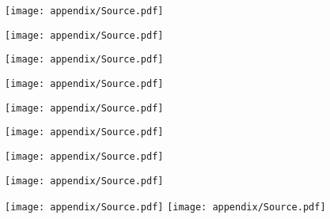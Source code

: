 

{\centering
\texttt{[image: appendix/Source.pdf]}

\texttt{[image: appendix/Source.pdf]}

\texttt{[image: appendix/Source.pdf]}

\texttt{[image: appendix/Source.pdf]}

\texttt{[image: appendix/Source.pdf]}

\texttt{[image: appendix/Source.pdf]}

\texttt{[image: appendix/Source.pdf]}

\texttt{[image: appendix/Source.pdf]}

\texttt{[image: appendix/Source.pdf]}
\texttt{[image: appendix/Source.pdf]}
}

